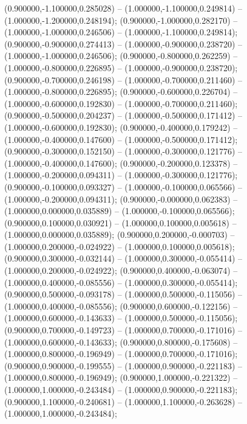  (0.900000,-1.100000,0.285028) -- (1.000000,-1.100000,0.249814) -- (1.000000,-1.200000,0.248194);
 (0.900000,-1.000000,0.282170) -- (1.000000,-1.000000,0.246506) -- (1.000000,-1.100000,0.249814);
 (0.900000,-0.900000,0.274413) -- (1.000000,-0.900000,0.238720) -- (1.000000,-1.000000,0.246506);
 (0.900000,-0.800000,0.262259) -- (1.000000,-0.800000,0.226895) -- (1.000000,-0.900000,0.238720);
 (0.900000,-0.700000,0.246198) -- (1.000000,-0.700000,0.211460) -- (1.000000,-0.800000,0.226895);
 (0.900000,-0.600000,0.226704) -- (1.000000,-0.600000,0.192830) -- (1.000000,-0.700000,0.211460);
 (0.900000,-0.500000,0.204237) -- (1.000000,-0.500000,0.171412) -- (1.000000,-0.600000,0.192830);
 (0.900000,-0.400000,0.179242) -- (1.000000,-0.400000,0.147600) -- (1.000000,-0.500000,0.171412);
 (0.900000,-0.300000,0.152150) -- (1.000000,-0.300000,0.121776) -- (1.000000,-0.400000,0.147600);
 (0.900000,-0.200000,0.123378) -- (1.000000,-0.200000,0.094311) -- (1.000000,-0.300000,0.121776);
 (0.900000,-0.100000,0.093327) -- (1.000000,-0.100000,0.065566) -- (1.000000,-0.200000,0.094311);
 (0.900000,-0.000000,0.062383) -- (1.000000,0.000000,0.035889) -- (1.000000,-0.100000,0.065566);
 (0.900000,0.100000,0.030921) -- (1.000000,0.100000,0.005618) -- (1.000000,0.000000,0.035889);
 (0.900000,0.200000,-0.000703) -- (1.000000,0.200000,-0.024922) -- (1.000000,0.100000,0.005618);
 (0.900000,0.300000,-0.032144) -- (1.000000,0.300000,-0.055414) -- (1.000000,0.200000,-0.024922);
 (0.900000,0.400000,-0.063074) -- (1.000000,0.400000,-0.085556) -- (1.000000,0.300000,-0.055414);
 (0.900000,0.500000,-0.093178) -- (1.000000,0.500000,-0.115056) -- (1.000000,0.400000,-0.085556);
 (0.900000,0.600000,-0.122156) -- (1.000000,0.600000,-0.143633) -- (1.000000,0.500000,-0.115056);
 (0.900000,0.700000,-0.149723) -- (1.000000,0.700000,-0.171016) -- (1.000000,0.600000,-0.143633);
 (0.900000,0.800000,-0.175608) -- (1.000000,0.800000,-0.196949) -- (1.000000,0.700000,-0.171016);
 (0.900000,0.900000,-0.199555) -- (1.000000,0.900000,-0.221183) -- (1.000000,0.800000,-0.196949);
 (0.900000,1.000000,-0.221322) -- (1.000000,1.000000,-0.243484) -- (1.000000,0.900000,-0.221183);
 (0.900000,1.100000,-0.240681) -- (1.000000,1.100000,-0.263628) -- (1.000000,1.000000,-0.243484);
